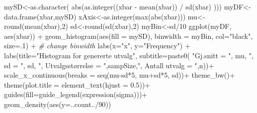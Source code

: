 \documentclass[
]{book}
\newenvironment{Shaded}{\begin{snugshade}}{\end{snugshade}}
\newcommand{\AttributeTok}[1]{\textcolor[rgb]{0.77,0.63,0.00}{#1}}
\newcommand{\CommentTok}[1]{\textcolor[rgb]{0.56,0.35,0.01}{\textit{#1}}}
\newcommand{\DecValTok}[1]{\textcolor[rgb]{0.00,0.00,0.81}{#1}}
\newcommand{\FloatTok}[1]{\textcolor[rgb]{0.00,0.00,0.81}{#1}}
\newcommand{\FunctionTok}[1]{\textcolor[rgb]{0.00,0.00,0.00}{#1}}
\newcommand{\NormalTok}[1]{#1}
\newcommand{\OtherTok}[1]{\textcolor[rgb]{0.56,0.35,0.01}{#1}}
\newcommand{\SpecialCharTok}[1]{\textcolor[rgb]{0.00,0.00,0.00}{#1}}
\newcommand{\StringTok}[1]{\textcolor[rgb]{0.31,0.60,0.02}{#1}}
\begin{document}
\begin{Shaded}
\begin{Highlighting}[]
\NormalTok{mySD}\OtherTok{\textless{}{-}}\FunctionTok{as.character}\NormalTok{( }\FunctionTok{abs}\NormalTok{(}\FunctionTok{as.integer}\NormalTok{((xbar }\SpecialCharTok{{-}} \FunctionTok{mean}\NormalTok{(xbar)) }\SpecialCharTok{/} \FunctionTok{sd}\NormalTok{(xbar) )))}
\NormalTok{myDF}\OtherTok{\textless{}{-}}\FunctionTok{data.frame}\NormalTok{(xbar,mySD)}
\NormalTok{xAxis}\OtherTok{\textless{}{-}}\FunctionTok{as.integer}\NormalTok{(}\FunctionTok{max}\NormalTok{(}\FunctionTok{abs}\NormalTok{(xbar)))}
\NormalTok{mu}\OtherTok{\textless{}{-}}\FunctionTok{round}\NormalTok{(}\FunctionTok{mean}\NormalTok{(xbar),}\DecValTok{2}\NormalTok{)}
\NormalTok{sd}\OtherTok{\textless{}{-}}\FunctionTok{round}\NormalTok{(}\FunctionTok{sd}\NormalTok{(xbar),}\DecValTok{2}\NormalTok{)}
\NormalTok{myBin}\OtherTok{\textless{}{-}}\NormalTok{sd}\SpecialCharTok{/}\DecValTok{10}
\FunctionTok{ggplot}\NormalTok{(myDF, }\FunctionTok{aes}\NormalTok{(xbar)) }\SpecialCharTok{+}
  \FunctionTok{geom\_histogram}\NormalTok{(}\FunctionTok{aes}\NormalTok{(}\AttributeTok{fill =}\NormalTok{ mySD), }\AttributeTok{binwidth =}\NormalTok{ myBin, }\AttributeTok{col=}\StringTok{"black"}\NormalTok{, }\AttributeTok{size=}\NormalTok{.}\DecValTok{1}\NormalTok{) }\SpecialCharTok{+}  \CommentTok{\# change binwidth}
  \FunctionTok{labs}\NormalTok{(}\AttributeTok{x=}\StringTok{"x"}\NormalTok{, }\AttributeTok{y=}\StringTok{"Frequency"}\NormalTok{) }\SpecialCharTok{+} 
  \FunctionTok{labs}\NormalTok{(}\AttributeTok{title=}\StringTok{"Histogram for genererte utvalg"}\NormalTok{,}
  \AttributeTok{subtitle=}\FunctionTok{paste0}\NormalTok{(  }\StringTok{"Gj.snitt = "}\NormalTok{, mu, }\StringTok{", sd = "}\NormalTok{, sd, }\StringTok{", Utvalgsstørrelse = "}\NormalTok{,sampSize,}\StringTok{", Antall utvalg = "}\NormalTok{,n))}\SpecialCharTok{+}
  \FunctionTok{scale\_x\_continuous}\NormalTok{(}\AttributeTok{breaks =} \FunctionTok{seq}\NormalTok{(mu}\SpecialCharTok{{-}}\NormalTok{sd}\SpecialCharTok{*}\DecValTok{5}\NormalTok{, mu}\SpecialCharTok{+}\NormalTok{sd}\SpecialCharTok{*}\DecValTok{5}\NormalTok{, sd))}\SpecialCharTok{+}
  \FunctionTok{theme\_bw}\NormalTok{()}\SpecialCharTok{+}
  \FunctionTok{theme}\NormalTok{(}\AttributeTok{plot.title =} \FunctionTok{element\_text}\NormalTok{(}\AttributeTok{hjust =} \FloatTok{0.5}\NormalTok{))}\SpecialCharTok{+}
  \FunctionTok{guides}\NormalTok{(}\AttributeTok{fill=}\FunctionTok{guide\_legend}\NormalTok{(}\FunctionTok{expression}\NormalTok{(sigma)))}\SpecialCharTok{+}
  \FunctionTok{geom\_density}\NormalTok{(}\FunctionTok{aes}\NormalTok{(}\AttributeTok{y=}\NormalTok{..count..}\SpecialCharTok{/}\DecValTok{90}\NormalTok{))}
\end{Highlighting}
\end{Shaded}
\end{document}
